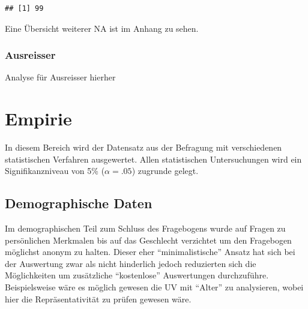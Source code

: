\documentclass[]{article}
\newenvironment{Shaded}{\begin{snugshade}}{\end{snugshade}}
\newcommand{\KeywordTok}[1]{\textcolor[rgb]{0.13,0.29,0.53}{\textbf{{#1}}}}
\newcommand{\DataTypeTok}[1]{\textcolor[rgb]{0.13,0.29,0.53}{{#1}}}
\newcommand{\DecValTok}[1]{\textcolor[rgb]{0.00,0.00,0.81}{{#1}}}
\newcommand{\StringTok}[1]{\textcolor[rgb]{0.31,0.60,0.02}{{#1}}}
\newcommand{\NormalTok}[1]{{#1}}
\begin{document}
\begin{verbatim}
## [1] 99
\end{verbatim}

Eine Übersicht weiterer NA ist im Anhang zu sehen.

\subsubsection{Ausreisser}\label{ausreisser}

Analyse für Ausreisser hierher

\section{Empirie}

In diesem Bereich wird der Datensatz aus der Befragung mit verschiedenen
statistischen Verfahren ausgewertet. Allen statistischen Untersuchungen
wird ein Signifikanzniveau von 5\% (\(\alpha = .05\)) zugrunde gelegt.

\subsection{Demographische Daten}\label{demographische-daten}

Im demographischen Teil zum Schluss des Fragebogens wurde auf Fragen zu
persönlichen Merkmalen bis auf das Geschlecht verzichtet um den
Fragebogen möglichst anonym zu halten. Dieser eher ``minimalistische''
Ansatz hat sich bei der Auswertung zwar als nicht hinderlich jedoch
reduzierten sich die Möglichkeiten um zusätzliche ``kostenlose''
Auswertungen durchzuführe. Beispielsweise wäre es möglich gewesen die UV
mit ``Alter'' zu analysieren, wobei hier die Repräsentativität zu prüfen
gewesen wäre.

\begin{Shaded}
\end{Shaded}
\end{document}
